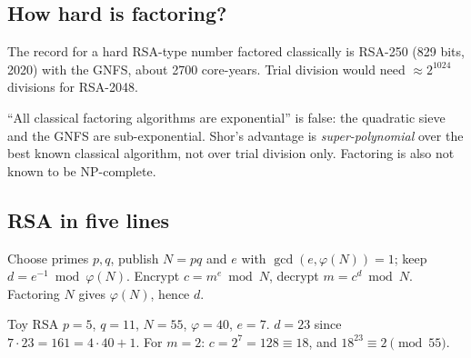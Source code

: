 \documentclass[11pt,a4paper,openany]{book}
\newcounter{wex}[chapter]
\begin{document}
\subsection{How hard is factoring?}
\begin{center}
\end{center}
The record for a hard RSA-type number factored classically is RSA-250 (829 bits, 2020) with the GNFS, about 2700 core-years. Trial division would need
$\approx2^{1024}$ divisions for RSA-2048.

\begin{trap}
``All classical factoring algorithms are exponential'' is false: the quadratic sieve and the GNFS are sub-exponential. Shor's advantage is
\emph{super-polynomial} over the best known classical algorithm, not over trial division only. Factoring is also not known to be NP-complete.
\end{trap}

\subsection{RSA in five lines}
Choose primes $p, q$, publish $N = pq$ and $e$ with $\gcd(e, \varphi(N)) = 1$; keep $d = e^{-1} \bmod \varphi(N)$. Encrypt $c = m^e \bmod N$, decrypt
$m = c^d \bmod N$. Factoring $N$ gives $\varphi(N)$, hence $d$.
\begin{wexample}{Toy RSA}
$p = 5$, $q = 11$, $N = 55$, $\varphi = 40$, $e = 7$. $d = 23$ since $7\cdot23 = 161 = 4\cdot40 + 1$. For $m = 2$: $c = 2^7 = 128 \equiv 18$, and $18^{23} \equiv 2 \pmod{55}$.
\end{wexample}
\end{document}
